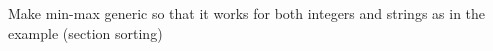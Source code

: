 \begin{Exercise}[title={Interfaces and min-max},difficulty=1]
\Question
Make min-max generic so that it works for both integers and strings
as in the example (section sorting)
\end{Exercise}

\begin{Answer}
\Question
\end{Answer}
